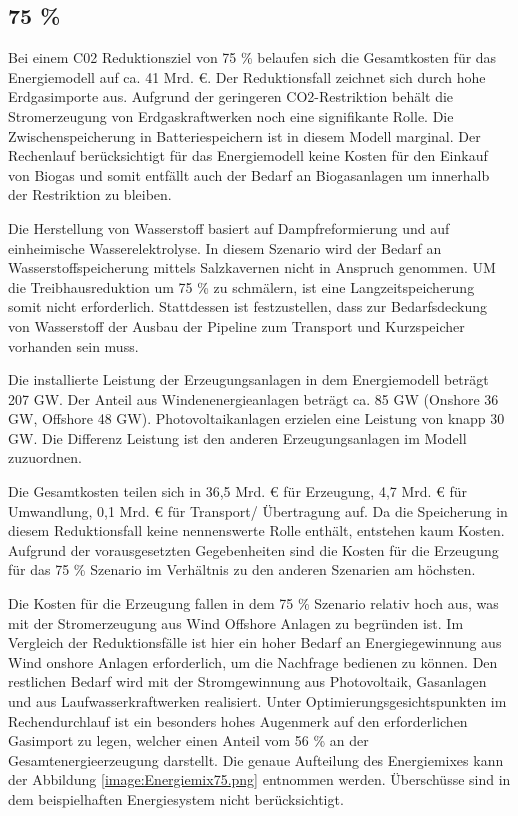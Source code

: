 \subsection{75 \%}
Bei einem C02 Reduktionsziel von 75 \% belaufen sich die Gesamtkosten für das Energiemodell auf ca. 41 Mrd. €. Der Reduktionsfall zeichnet sich durch hohe Erdgasimporte aus. Aufgrund der geringeren CO2-Restriktion behält die Stromerzeugung von Erdgaskraftwerken noch eine signifikante Rolle. Die Zwischenspeicherung in Batteriespeichern ist in diesem Modell marginal. Der Rechenlauf berücksichtigt für das Energiemodell keine Kosten für den Einkauf von Biogas und somit entfällt auch der Bedarf an Biogasanlagen um innerhalb der Restriktion zu bleiben. 

Die Herstellung von Wasserstoff basiert auf Dampfreformierung und auf einheimische Wasserelektrolyse. In diesem Szenario wird der Bedarf an Wasserstoffspeicherung mittels Salzkavernen nicht in Anspruch genommen. UM die Treibhausreduktion um 75 \% zu schmälern, ist eine Langzeitspeicherung somit nicht erforderlich. Stattdessen ist festzustellen, dass zur Bedarfsdeckung von Wasserstoff der Ausbau der Pipeline zum Transport und Kurzspeicher vorhanden sein muss. 

Die installierte Leistung der Erzeugungsanlagen in dem Energiemodell beträgt 207 GW.  Der Anteil aus Windenenergieanlagen beträgt ca. 85 GW (Onshore 36 GW, Offshore 48 GW). Photovoltaikanlagen erzielen eine Leistung von knapp 30 GW. Die Differenz Leistung ist den anderen Erzeugungsanlagen im Modell zuzuordnen. 

Die Gesamtkosten teilen sich in 36,5 Mrd. € für Erzeugung, 4,7 Mrd. € für Umwandlung, 0,1 Mrd. € für Transport/ Übertragung auf. Da die Speicherung in diesem Reduktionsfall keine nennenswerte Rolle enthält, entstehen kaum Kosten. Aufgrund der vorausgesetzten Gegebenheiten sind die Kosten für die Erzeugung für das 75 \% Szenario im Verhältnis zu den anderen Szenarien am höchsten. 

Die Kosten für die Erzeugung fallen in dem 75 \% Szenario relativ hoch aus, was mit der Stromerzeugung aus Wind Offshore Anlagen zu begründen ist. Im Vergleich der Reduktionsfälle ist hier ein hoher Bedarf an Energiegewinnung aus Wind onshore Anlagen erforderlich, um die Nachfrage bedienen zu können. Den restlichen Bedarf wird mit der Stromgewinnung aus Photovoltaik, Gasanlagen und aus Laufwasserkraftwerken realisiert. Unter Optimierungsgesichtspunkten im Rechendurchlauf ist ein besonders hohes Augenmerk auf den erforderlichen Gasimport zu legen, welcher einen Anteil vom 56 \% an der Gesamtenergieerzeugung darstellt. Die genaue Aufteilung des Energiemixes kann der Abbildung \ref{image:Energiemix75.png} entnommen werden. Überschüsse sind in dem beispielhaften Energiesystem nicht berücksichtigt.
 

